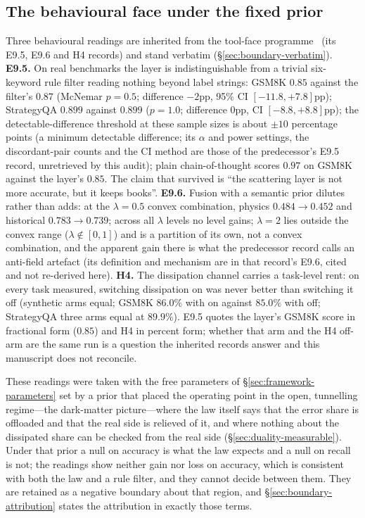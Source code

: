 \documentclass[11pt,a4paper]{article}
\begin{document}
\subsection{The behavioural face under the fixed prior}
\label{sec:empirics-behavioural}

Three behavioural readings are inherited from the tool-face programme~\cite{deposon2026} (its E9.5, E9.6 and H4 records) and stand verbatim (\S\ref{sec:boundary-verbatim}). \textbf{E9.5.} On real benchmarks the layer is indistinguishable from a trivial six-keyword rule filter reading nothing beyond label strings: GSM8K $0.85$ against the filter's $0.87$ (McNemar $p=0.5$; difference $-2$pp, 95\% CI $[-11.8, +7.8]$pp); StrategyQA $0.899$ against $0.899$ ($p=1.0$; difference $0$pp, CI $[-8.8, +8.8]$pp); the detectable-difference threshold at these sample sizes is about $\pm10$ percentage points (a minimum detectable difference; its $\alpha$ and power settings, the discordant-pair counts and the CI method are those of the predecessor's E9.5 record, unretrieved by this audit); plain chain-of-thought scores $0.97$ on GSM8K against the layer's $0.85$. The claim that survived is ``the scattering layer is not more accurate, but it keeps books''. \textbf{E9.6.} Fusion with a semantic prior dilutes rather than adds: at the $\lambda=0.5$ convex combination, physics $0.484 \to 0.452$ and historical $0.783 \to 0.739$; across all $\lambda$ levels no level gains; $\lambda = 2$ lies outside the convex range ($\lambda \notin [0,1]$) and is a partition of its own, not a convex combination, and the apparent gain there is what the predecessor record calls an anti-field artefact (its definition and mechanism are in that record's E9.6, cited and not re-derived here). \textbf{H4.} The dissipation channel carries a task-level rent: on every task measured, switching dissipation on was never better than switching it off (synthetic arms equal; GSM8K $86.0\%$ with on against $85.0\%$ with off; StrategyQA three arms equal at $89.9\%$). E9.5 quotes the layer's GSM8K score in fractional form ($0.85$) and H4 in percent form; whether that arm and the H4 off-arm are the same run is a question the inherited records answer and this manuscript does not reconcile.

These readings were taken with the free parameters of \S\ref{sec:framework-parameters} set by a prior that placed the operating point in the open, tunnelling regime---the dark-matter picture---where the law itself says that the error share is offloaded and that the real side is relieved of it, and where nothing about the dissipated share can be checked from the real side (\S\ref{sec:duality-measurable}). Under that prior a null on accuracy is what the law expects and a null on recall is not; the readings show neither gain nor loss on accuracy, which is consistent with both the law and a rule filter, and they cannot decide between them. They are retained as a negative boundary about that region, and \S\ref{sec:boundary-attribution} states the attribution in exactly those terms.
\end{document}
